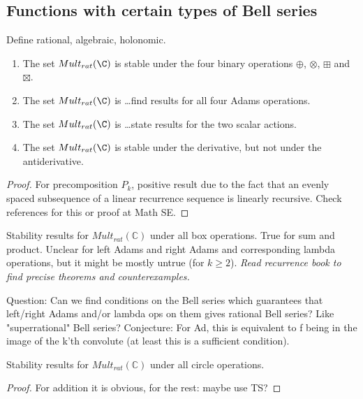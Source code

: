 \documentclass[a4paper]{article}
\begin{document}
\subsection{Functions with certain types of Bell series}

Define rational, algebraic, holonomic.

\begin{theorem}
\begin{enumerate}
\item The set $Mult_{rat}(\C)$ is stable under the four binary operations $\oplus$, $\otimes$, $\boxplus$ and $\boxtimes$.
\item The set $Mult_{rat}(\C)$ is \ldots find results for all four Adams operations.
\item The set $Mult_{rat}(\C)$ is \ldots state results for the two scalar actions.
\item The set $Mult_{rat}(\C)$ is stable under the derivative, but not under the antiderivative.
\end{enumerate}
\end{theorem}
\begin{proof}
For precomposition $P_k$, positive result due to the fact that an evenly spaced subsequence of a linear recurrence sequence is linearly recursive. Check references for this or proof at Math SE.
\end{proof}

\begin{theorem}
Stability results for $Mult_{rat}(\mathbb{C})$ under all box operations. True for sum and product. Unclear for left Adams and right Adams and corresponding lambda operations, but it might be mostly untrue (for $k \geq 2$). \emph{Read recurrence book to find precise theorems and counterexamples.}
\end{theorem}

Question: Can we find conditions on the Bell series which guarantees that left/right Adams and/or lambda ops on them gives rational Bell series? Like "superrational" Bell series? Conjecture: For Ad, this is equivalent to f being in the image of the k'th convolute (at least this is a sufficient condition). 




\begin{theorem}
Stability results for $Mult_{rat}(\mathbb{C})$ under all circle operations.
\end{theorem}
\begin{proof}
For addition it is obvious, for the rest: maybe use TS?
\end{proof}
\end{document}
